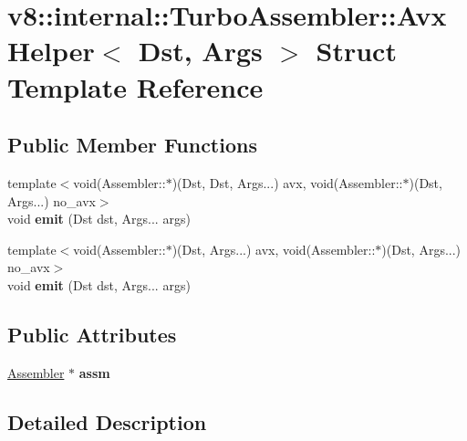 \hypertarget{structv8_1_1internal_1_1TurboAssembler_1_1AvxHelper}{}\section{v8\+:\+:internal\+:\+:Turbo\+Assembler\+:\+:Avx\+Helper$<$ Dst, Args $>$ Struct Template Reference}
\label{structv8_1_1internal_1_1TurboAssembler_1_1AvxHelper}
\subsection*{Public Member Functions}
\begin{DoxyCompactItemize}
\item 
\mbox{\label{structv8_1_1internal_1_1TurboAssembler_1_1AvxHelper_a83e3a49215dbfa6d28c209f379b6f4c9}} 
{\footnotesize template$<$void(\+Assembler\+::$\ast$)(\+Dst, Dst, Args...) avx, void(\+Assembler\+::$\ast$)(\+Dst, Args...) no\+\_\+avx$>$ }\\void {\bfseries emit} (Dst dst, Args... args)
\item 
\mbox{\label{structv8_1_1internal_1_1TurboAssembler_1_1AvxHelper_a83e3a49215dbfa6d28c209f379b6f4c9}} 
{\footnotesize template$<$void(\+Assembler\+::$\ast$)(\+Dst, Args...) avx, void(\+Assembler\+::$\ast$)(\+Dst, Args...) no\+\_\+avx$>$ }\\void {\bfseries emit} (Dst dst, Args... args)
\end{DoxyCompactItemize}
\subsection*{Public Attributes}
\begin{DoxyCompactItemize}
\item 
\mbox{\label{structv8_1_1internal_1_1TurboAssembler_1_1AvxHelper_a0e365fc010f15bb5ca29ff240716997f}} 
\mbox{\hyperlink{classv8_1_1internal_1_1Assembler}{Assembler}} $\ast$ {\bfseries assm}
\end{DoxyCompactItemize}


\subsection{Detailed Description}

